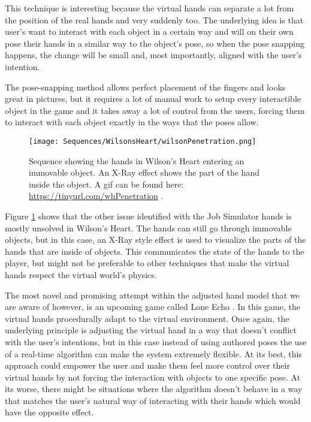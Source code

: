 This technique is interesting because the virtual hands can separate a lot from the position of the real hands and very suddenly too. The underlying idea is that user's want to interact with each object in a certain way and will on their own pose their hands in a similar way to the object's pose, so when the pose snapping happens, the change will be small and, most importantly, aligned with the user's intention. 

The pose-snapping method allows perfect placement of the fingers and looks great in pictures, but it requires a lot of manual work to setup every interactible object in the game and it takes away a lot of control from the users, forcing them to interact with each object exactly in the ways that the poses allow.

\begin{figure}[H]
\centering
\texttt{[image: Sequences/WilsonsHeart/wilsonPenetration.png]}
\caption{Sequence showing the hands in Wilson's Heart entering an immovable object. An X-Ray effect shows the part of the hand inside the object. A gif can be found here: \url{https://tinyurl.com/whPenetration} .}
\label{fig:wilsonPenetration}
\end{figure}

Figure \ref{fig:wilsonPenetration} shows that the other issue identified with the Job Simulator hands is mostly unsolved in Wilson's Heart. The hands can still go through immovable objects, but in this case, an X-Ray style effect is used to visualize the parts of the hands that are inside of objects. This communicates the state of the hands to the player, but might not be preferable to other techniques that make the virtual hands respect the virtual world's physics.

The most novel and promising attempt within the adjusted hand model that we are aware of however, is an upcoming game called Lone Echo \parencite{ReadyAtDawn}. In this game, the virtual hands procedurally adapt to the virtual environment. Once again, the underlying principle is adjusting the virtual hand in a way that doesn't conflict with the user's intentions, but in this case instead of using authored poses the use of a real-time algorithm can make the system extremely flexible. At its best, this approach could empower the user and make them feel more control over their virtual hands by not forcing the interaction with objects to one specific pose. At its worse, there might be situations where the algorithm doesn't behave in a way that matches the user's natural way of interacting with their hands which would have the opposite effect.


